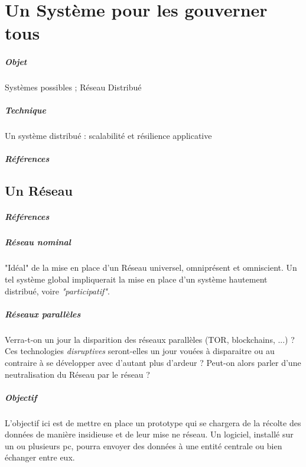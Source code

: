 \chapter{Un Système pour les gouverner tous}
\paragraph{Objet} Systèmes possibles ; Réseau Distribué
\paragraph{Technique} Un système distribué : scalabilité et résilience applicative
\paragraph{Références}
\cite{Deleuze0}
\cite{Foucault0}
\cite{Negri0}
\cite{Pieces0}
\cite{ProgrammableCity0}
\cite{ProgrammableCity1}
\cite{PsychoPass}

\section{Un Réseau}
\paragraph{Références} \cite{DarkWeb0}

\paragraph{Réseau \emph{nominal}} "Idéal" de la mise en place d'un Réseau universel, omniprésent
et omniscient. Un tel système global impliquerait la mise en place d'un système hautement
distribué, voire \emph{"participatif"}.

\paragraph{Réseaux parallèles} Verra-t-on un jour la disparition des réseaux parallèles
(TOR, blockchains, ...) ? Ces technologies \emph{disruptives} seront-elles un jour vouées
à disparaitre ou au contraire à se développer avec d'autant plus d'ardeur ? Peut-on alors
parler d'une neutralisation du Réseau par le réseau ?

\paragraph{Objectif} L'objectif ici est de mettre en place un prototype qui se chargera de la récolte des données
de manière insidieuse et de leur mise ne réseau. Un logiciel, installé sur un ou plusieurs pc,
pourra envoyer des données à une entité centrale ou bien échanger entre eux.


